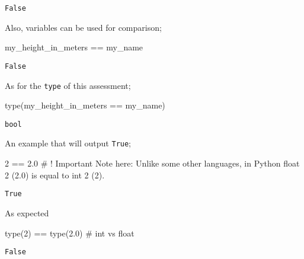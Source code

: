 \documentclass[
  letterpaper,
  DIV=11,
  numbers=noendperiod]{scrreprt}
\newenvironment{Shaded}{\begin{snugshade}}{\end{snugshade}}
\newcommand{\BuiltInTok}[1]{\textcolor[rgb]{0.00,0.23,0.31}{#1}}
\newcommand{\CommentTok}[1]{\textcolor[rgb]{0.37,0.37,0.37}{#1}}
\newcommand{\DecValTok}[1]{\textcolor[rgb]{0.68,0.00,0.00}{#1}}
\newcommand{\FloatTok}[1]{\textcolor[rgb]{0.68,0.00,0.00}{#1}}
\newcommand{\NormalTok}[1]{\textcolor[rgb]{0.00,0.23,0.31}{#1}}
\newcommand{\OperatorTok}[1]{\textcolor[rgb]{0.37,0.37,0.37}{#1}}
\begin{document}
\begin{verbatim}
False
\end{verbatim}

Also, variables can be used for comparison;

\begin{Shaded}
\begin{Highlighting}[]
\NormalTok{my\_height\_in\_meters }\OperatorTok{==}\NormalTok{ my\_name}
\end{Highlighting}
\end{Shaded}

\begin{verbatim}
False
\end{verbatim}

As for the \texttt{type} of this assessment;

\begin{Shaded}
\begin{Highlighting}[]
\BuiltInTok{type}\NormalTok{(my\_height\_in\_meters }\OperatorTok{==}\NormalTok{ my\_name)}
\end{Highlighting}
\end{Shaded}

\begin{verbatim}
bool
\end{verbatim}

An example that will output \texttt{True};

\begin{Shaded}
\begin{Highlighting}[]
\DecValTok{2} \OperatorTok{==} \FloatTok{2.0} \CommentTok{\# ! Important Note here: Unlike some other languages, in Python float 2 (2.0) is equal to int 2 (2).}
\end{Highlighting}
\end{Shaded}

\begin{verbatim}
True
\end{verbatim}

As expected

\begin{Shaded}
\begin{Highlighting}[]
\BuiltInTok{type}\NormalTok{(}\DecValTok{2}\NormalTok{) }\OperatorTok{==} \BuiltInTok{type}\NormalTok{(}\FloatTok{2.0}\NormalTok{) }\CommentTok{\# int vs float}
\end{Highlighting}
\end{Shaded}

\begin{verbatim}
False
\end{verbatim}
\end{document}
